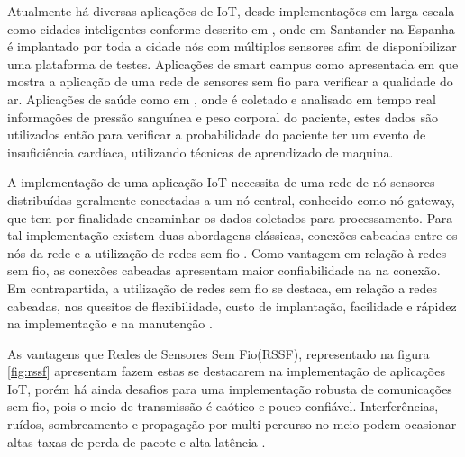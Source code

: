 Atualmente há diversas aplicações de IoT, desde implementações em larga escala como cidades inteligentes conforme descrito em \cite{sotres2017practical}, onde em Santander na Espanha é implantado por toda a cidade nós com múltiplos sensores afim de disponibilizar uma plataforma de testes. Aplicações de smart campus como apresentada em \cite{wang2017performance} que mostra a aplicação de uma rede de sensores sem fio para verificar a qualidade do ar. Aplicações de saúde como em \cite{zhang2015remote}, onde é coletado e analisado em tempo real informações de pressão sanguínea e peso corporal do paciente, estes dados são utilizados então para verificar a probabilidade do paciente ter um evento de insuficiência cardíaca, utilizando técnicas de aprendizado de maquina.


A implementação de uma aplicação IoT necessita de uma rede de nó sensores distribuídas geralmente conectadas a um nó central, conhecido como nó gateway, que tem por finalidade encaminhar os dados coletados para processamento. Para tal implementação existem duas abordagens clássicas, conexões cabeadas entre os nós da rede e a utilização de redes sem fio \cite{gomes2017estimaccao}. Como vantagem em relação à redes sem fio, as conexões cabeadas apresentam maior confiabilidade na na conexão. Em contrapartida, a utilização de redes sem fio se destaca, em relação a redes cabeadas, nos quesitos de flexibilidade, custo de implantação, facilidade e rápidez na implementação e na manutenção \cite{gungor2009industrial}.

As vantagens que Redes de Sensores Sem Fio(RSSF), representado na figura \ref{fig:rssf} apresentam fazem estas se destacarem na implementação de aplicações IoT, porém há ainda desafios para uma implementação robusta de comunicações sem fio, pois o meio de transmissão é caótico e pouco confiável. Interferências, ruídos, sombreamento e propagação por multi percurso no meio podem ocasionar altas taxas de perda de pacote e alta latência \cite{gomes2017estimaccao}.

